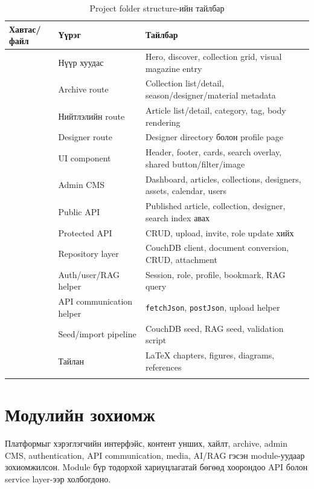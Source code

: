 \begin{longtable}{|L{0.24\textwidth}|L{0.30\textwidth}|L{0.32\textwidth}|}
  \hline
  \textbf{Хавтас/файл} & \textbf{Үүрэг} & \textbf{Тайлбар} \\ \hline
   & Нүүр хуудас & Hero, discover, collection grid, visual magazine entry \\ \hline
   & Archive route & Collection list/detail, season/designer/material metadata \\ \hline
   & Нийтлэлийн route & Article list/detail, category, tag, body rendering \\ \hline
   & Designer route & Designer directory болон profile page \\ \hline
   & UI component & Header, footer, cards, search overlay, shared button/filter/image \\ \hline
   & Admin CMS & Dashboard, articles, collections, designers, assets, calendar, users \\ \hline
   & Public API & Published article, collection, designer, search index авах \\ \hline
   & Protected API & CRUD, upload, invite, role update хийх \\ \hline
   & Repository layer & CouchDB client, document conversion, CRUD, attachment \\ \hline
   & Auth/user/RAG helper & Session, role, profile, bookmark, RAG query \\ \hline
   & API communication helper & \texttt{fetchJson}, \texttt{postJson}, upload helper \\ \hline
   & Seed/import pipeline & CouchDB seed, RAG seed, validation script \\ \hline
   & Тайлан & LaTeX chapters, figures, diagrams, references \\ \hline
  \caption{Project folder structure-ийн тайлбар}
  \label{tab:ch3-project-structure}\\
\end{longtable}

\section{Модулийн зохиомж}
Платформыг хэрэглэгчийн интерфэйс, контент унших, хайлт, archive, admin CMS, authentication, API communication, media, AI/RAG гэсэн module-уудаар зохиомжилсон. Module бүр тодорхой хариуцлагатай бөгөөд хоорондоо API болон service layer-ээр холбогдоно.

